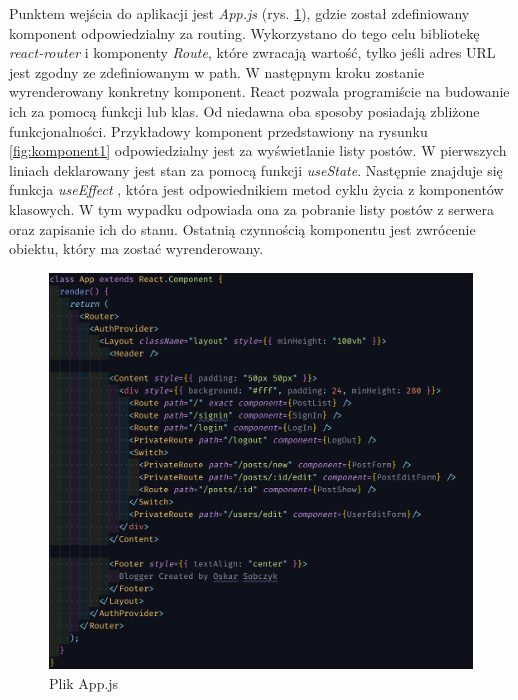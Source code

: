 \documentclass[declaration,shortabstract,polish,inz]{iithesis}
\begin{document}
Punktem wejścia do aplikacji jest \textit{App.js} (rys. \ref{fig:app.js}), gdzie został zdefiniowany komponent odpowiedzialny za routing. Wykorzystano do tego celu bibliotekę \textit{react-router}\cite{reactrouter} i komponenty \textit{Route}, które zwracają wartość, tylko jeśli adres URL jest zgodny ze zdefiniowanym w path. W następnym kroku zostanie wyrenderowany konkretny komponent. React pozwala programiście na budowanie ich za pomocą funkcji lub klas. Od niedawna oba sposoby posiadają zbliżone funkcjonalności. Przykładowy komponent przedstawiony na rysunku \ref{fig:komponent1} odpowiedzialny jest za wyświetlanie listy postów. W pierwszych liniach deklarowany jest stan za pomocą funkcji \textit{useState}. Następnie znajduje się funkcja \textit{useEffect} \cite{hooks}, która jest odpowiednikiem metod cyklu życia z komponentów klasowych. W tym wypadku odpowiada ona za pobranie listy postów z serwera oraz zapisanie ich do stanu. Ostatnią czynnością komponentu jest zwrócenie obiektu, który ma zostać wyrenderowany.

\begin{figure}[H]
    \centering
    \includegraphics[width=\textwidth]{images/appjs.png}
    \caption{Plik App.js}
    \label{fig:app.js}
\end{figure}
\end{document}
